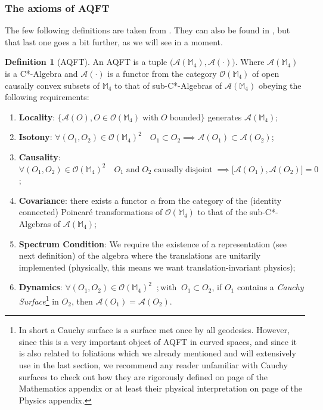\documentclass[a4paper,11pt]{article}
\numberwithin{equation}{section}
\theoremstyle{definition}
\newtheorem{definition}{Definition}
\begin{document}
\subsubsection{The axioms of AQFT}
The few following definitions are taken from \cite{AQFT_Intro}. They can also be found in \cite{pAQFT}, but that last one goes a bit further, as we will see in a moment.
\begin{definition}[AQFT] \label{AQFT_M4-Ax}
    An AQFT is a tuple $\big(\mathcal{A}(\mathbb{M}_4), \mathcal{A}(\cdot)\big)$. Where $\mathcal{A}(\mathbb{M}_4)$ is a C*-Algebra and $\mathcal{A}(\cdot)$ is a functor from the category $\mathcal{O}(\mathbb{M}_4)$ of open causally convex subsets of $\mathbb{M}_4$ to that of sub-C*-Algebras of $\mathcal{A}(\mathbb{M}_4)$ obeying the following requirements:
    \begin{enumerate}
        \item \textbf{Locality}:  $\big\{\mathcal{A}(O), O \in \mathcal{O}(\mathbb{M}_4) \; \mathrm{with}\; O\; \mathrm{bounded}\big\}$ generates $\mathcal{A}(\mathbb{M}_4)$;
        \item \textbf{Isotony}: $\forall (O_1, O_2) \in \mathcal{O}(\mathbb{M}_4)^2 \quad O_1\subset O_2 \implies \mathcal{A}(O_1)\subset\mathcal{A}(O_2)$;
        \item \textbf{Causality}: $\forall (O_1, O_2) \in \mathcal{O}(\mathbb{M}_4)^2 \quad O_1 \; \mathrm{and}\; O_2\; \mathrm{causally}\;\mathrm{disjoint}\; \implies \big[\mathcal{A}(O_1),\mathcal{A}(O_2)\big]=0$;
        \item \textbf{Covariance}: there exists a functor $\alpha$ from the category of the (identity connected) Poincaré transformations of $\mathcal{O}(\mathbb{M}_4)$ to that of the sub-C*-Algebras of $\mathcal{A}(\mathbb{M}_4)$;
        \item \textbf{Spectrum Condition}: We require the existence of a representation (see next definition) of the algebra where the translations are unitarily implemented (physically, this means we want translation-invariant physics);
        \item \textbf{Dynamics}: $\forall (O_1, O_2) \in \mathcal{O}(\mathbb{M}_4)^2 \;\;;\mathrm{with} \;\;O_1 \subset O_2$, if $O_1$ contains a \emph{Cauchy Surface}\footnote{In short a Cauchy surface is a surface met once by all geodesics. However, since this is a very important object of AQFT in curved spaces, and since it is also related to foliations which we already mentioned and will extensively use in the last section, we recommend any reader unfamiliar with Cauchy surfaces to check out how they are rigorously defined on page \pageref{CauchyMat} of the Mathematics appendix or at least their physical interpretation on page \pageref{CauchyPhy} of the Physics appendix.} in $O_2$, then $\mathcal{A}(O_1)=\mathcal{A}(O_2)$.
    \end{enumerate}
    

\end{definition}
\end{document}
